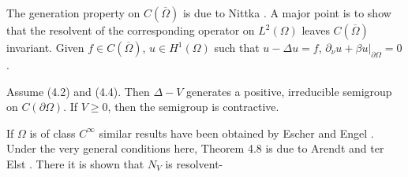 The generation property on $C(\overline{\Omega})$ is due to Nittka \cite{Ni11}. A major point is to show that the resolvent of the corresponding operator on $L^2(\Omega)$ leaves $C(\overline{\Omega})$ invariant. Given $f \in C(\overline{\Omega})$, $u \in H^1(\Omega)$ such that $u - \Delta u = f$, $\partial_\nu u + \beta u|_{\partial\Omega} = 0$.

\begin{theorem}[4.8]
Assume (4.2) and (4.4). Then $\Delta - V$ generates a positive, irreducible semigroup on $C(\partial\Omega)$. If $V \geq 0$, then the semigroup is contractive.
\end{theorem}

If $\Omega$ is of class $C^\infty$ similar results have been obtained by Escher \cite{Es94} and Engel \cite{En03}. Under the very general conditions here, Theorem 4.8 is due to Arendt and ter Elst \cite{AtE20}. There it is shown that $N_V$ is resolvent-